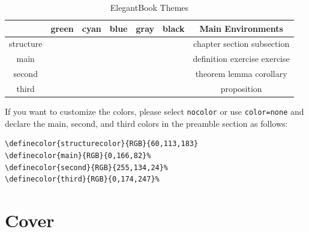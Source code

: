 \documentclass[11pt]{elegantbook}
\begin{document}
\begin{table}[htbp]
\caption{ElegantBook Themes\label{tab:color thm}}
\centering
\begin{tabular}{ccccccc}
\toprule
          & \textcolor{structure1}{green} 
          & \textcolor{structure2}{cyan} 
          & \textcolor{structure3}{blue}
          & \textcolor{structure4}{gray} 
          & \textcolor{structure5}{black} 
          & Main Environments\\
\midrule
structure & \makecell{{\color{structure1}\rule{1cm}{1cm}}}
        & \makecell{{\color{structure2}\rule{1cm}{1cm}}}
        & \makecell{{\color{structure3}\rule{1cm}{1cm}}} 
        & \makecell{{\color{structure4}\rule{1cm}{1cm}}} 
        & \makecell{{\color{structure5}\rule{1cm}{1cm}}} 
        & chapter  section  subsection \\
main      & \makecell{{\color{main1}\rule{1cm}{1cm}}}
        & \makecell{{\color{main2}\rule{1cm}{1cm}}}
        & \makecell{{\color{main3}\rule{1cm}{1cm}}}
        & \makecell{{\color{main4}\rule{1cm}{1cm}}}
        & \makecell{{\color{main5}\rule{1cm}{1cm}}}
        & definition  exercise  exercise  \\
second    & \makecell{{\color{second1}\rule{1cm}{1cm}}}
        & \makecell{{\color{second2}\rule{1cm}{1cm}}}
        & \makecell{{\color{second3}\rule{1cm}{1cm}}}
        & \makecell{{\color{second4}\rule{1cm}{1cm}}}
        & \makecell{{\color{second5}\rule{1cm}{1cm}}}
        & theorem  lemma  corollary\\
third     & \makecell{{\color{third1}\rule{1cm}{1cm}}}
        & \makecell{{\color{third2}\rule{1cm}{1cm}}}
        & \makecell{{\color{third3}\rule{1cm}{1cm}}}
        & \makecell{{\color{third4}\rule{1cm}{1cm}}}
        & \makecell{{\color{third5}\rule{1cm}{1cm}}}
        & proposition\\
\bottomrule
\end{tabular}
\end{table}

If you want to customize the colors, please select \lstinline{nocolor} or use \lstinline{color=none} and declare the main, second, and third colors in the preamble section as follows:
\begin{lstlisting}[frame=single]
\definecolor{structurecolor}{RGB}{60,113,183}
\definecolor{main}{RGB}{0,166,82}%
\definecolor{second}{RGB}{255,134,24}%
\definecolor{third}{RGB}{0,174,247}% 
\end{lstlisting}

\section{Cover}
\end{document}
